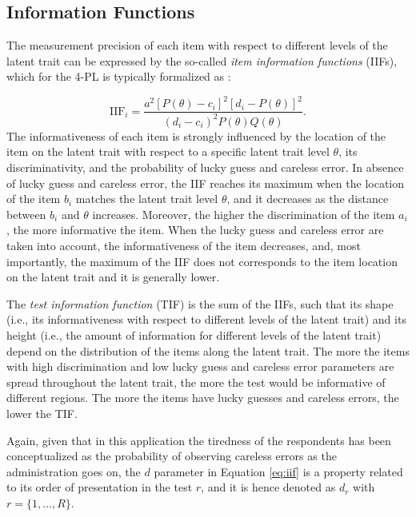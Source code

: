 \documentclass{svproc}
\begin{document}
\subsection{Information Functions}

The measurement precision of each item with respect to different levels of the latent trait can be expressed by the so-called \emph{item information functions} (IIFs), which for the 4-PL is typically formalized as \cite{magis:iif}: 

\begin{equation}\label{eq:iif}
	\text{IIF}_i = \dfrac{a^2[P(\theta)-c_i]^2[d_i - P(\theta)]^2}{(d_i-c_i)^2 P(\theta)Q(\theta)}.
\end{equation}
The informativeness of each item is strongly influenced by the location of the item on the latent trait with respect to a specific latent trait level $\theta$, its discriminativity, and the probability of lucky guess and careless error. In absence of lucky guess and careless error, the IIF reaches its maximum when the location of the item $b_i$ matches the latent trait level $\theta$, and it decreases as the distance between $b_i$ and $\theta$ increases. Moreover, the higher the discrimination of the item $a_i$, the more informative the item. When the lucky guess and careless error are taken into account, the informativeness of the item decreases, and, most importantly, the maximum of the IIF does not corresponds to the item location on the latent trait and it is generally lower. 

The \emph{test information function} (TIF) is the sum of the IIFs, such that its shape (i.e., its informativeness with respect to different levels of the latent trait) and its height (i.e., the amount of information for different levels of the latent trait) depend on the distribution of the items along the latent trait. The more the items with high discrimination and low lucky guess and careless error parameters are spread throughout the latent trait, the more the test would be informative of different regions. The more the items have lucky guesses and careless errors, the lower the TIF. 

\color{blue}
Again, given that in this application the tiredness of the respondents has been conceptualized as the probability of observing careless errors as the administration goes on, the $d$ parameter in Equation \ref{eq:iif} is a property related to its order of presentation in the test $r$, and it is hence denoted as $d_r$ with $r = \{1, \ldots, R\}$.
\normalcolor
\end{document}
